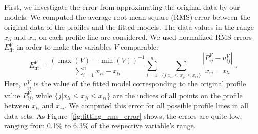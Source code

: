 First, we investigate the error from approximating the original data by our
models. We computed the average root mean square (RMS) error between the
original data of the profiles and the fitted models. The data values in the
range $x_{li}$ and $x_{ri}$ on each profile line are considered.
%
%
We used normalized RMS errors $E^V_{\text{fit}}$ in order to make the
variables $V$ comparable:
%
%
\begin{equation*}
	E^V_{\text{fit}} 
		= 	\frac{(\max(V)-\min(V))^{-1}}{\sum_{i=1}^n x_{ri}-x_{li}} 
			\sum_{i=1}^n~
			\sum_{\{j | x_{li} \leq x_{ji} \leq x_{ri}\}}
						\frac{|P_{ij}^V-u_{ij}^V|}
							{x_{ri}-x_{li}} 
	\text{ .}
\end{equation*}
%
Here, $u_{ij}^V$ is the value of the fitted model corresponding to the original
profile value $P_{ij}^V$, while $\{j | x_{li} \leq x_{ji} \leq x_{ri}\}$ are the
indices of all points on the profile between $x_{li}$ and $x_{ri}$. We computed
this error for all possible profile lines in all data sets.
% 
%
As Figure~\ref{fig:fitting_rms_error} shows, the errors are quite low, ranging
from 0.1\% to 6.3\% of the respective variable's range.

